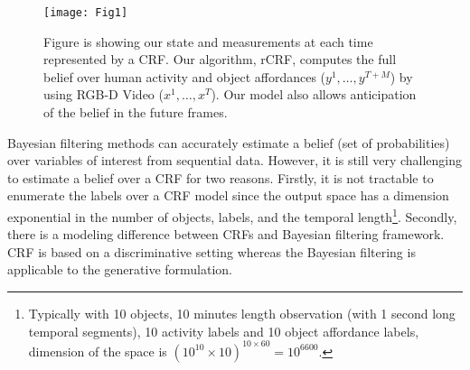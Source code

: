 




\begin{figure}[t]
\texttt{[image: Fig1]}
\caption{Figure is showing our state and measurements at each time represented by a CRF.
Our algorithm, rCRF, computes the full belief over human activity and object affordances ($y^1,\ldots,y^{T+M}$) by using RGB-D Video ($x^1,\ldots,x^T$).
Our model also allows anticipation of the belief in the future frames.}
\label{fig1}
\end{figure}

Bayesian filtering methods can accurately estimate a belief (set of probabilities) over variables of interest from sequential data. However, it is still very challenging to estimate a belief over a CRF for two reasons. Firstly, it is not tractable to enumerate the labels over a CRF model since the output space has a dimension exponential in the number of objects, labels, and the temporal length\footnote{Typically with 10 objects, 10 minutes length observation (with 1 second long temporal segments), 10 activity labels and 10 object affordance labels, dimension of the space is $(10^{10}\times10)^{10\times60}=10^{6600}$.}. Secondly, there is a modeling difference between CRFs and Bayesian filtering framework. CRF is based on a discriminative setting whereas the Bayesian filtering is applicable to the generative formulation.

